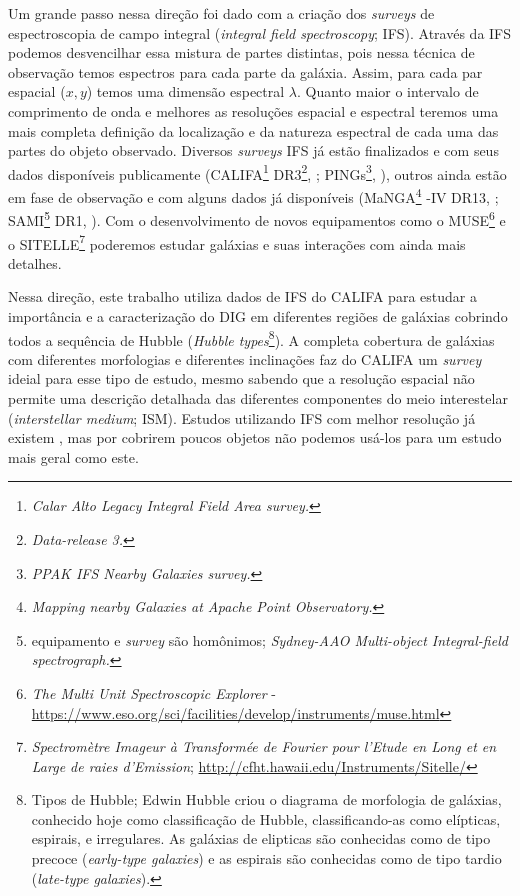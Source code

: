 Um grande passo nessa direção foi dado com a criação dos {\em surveys} de espectroscopia de campo integral ({\em integral field spectroscopy}; IFS). Através da IFS podemos desvencilhar essa mistura de partes distintas, pois nessa técnica de observação temos espectros para cada parte da galáxia. Assim, para cada par espacial ($x,y$) temos uma dimensão espectral $\lambda$. Quanto maior o intervalo de comprimento de onda e melhores as resoluções espacial e espectral teremos uma mais completa definição da localização e da natureza espectral de cada uma das partes do objeto observado. Diversos {\em surveys} IFS já estão finalizados e com seus dados disponíveis publicamente (CALIFA\footnote{\em Calar Alto Legacy Integral Field Area survey.} DR3\footnote{\em Data-release 3.}, \citealt{SFSanchez.DR3.2016}; PINGs\footnote{\em PPAK IFS Nearby Galaxies survey.}, \citealt{RosalesOrtega.etal.2010}), outros ainda estão em fase de observação e com alguns dados já disponíveis (MaNGA\footnote{\em Mapping nearby Galaxies at Apache Point Observatory.} \SDSS-IV DR13, \citealt{MaNGADR1.2017}; SAMI\footnote{equipamento e {\em survey} são homônimos; {\em Sydney-AAO Multi-object Integral-field spectrograph.}} DR1, \citealt{SAMIDR1.2017}). Com o desenvolvimento de novos equipamentos como o MUSE\footnote{{\em The Multi Unit Spectroscopic Explorer} - \href{https://www.eso.org/sci/facilities/develop/instruments/muse.html}{https://www.eso.org/sci/facilities/develop/instruments/muse.html}} e o SITELLE\footnote{{\em Spectromètre Imageur à Transformée de Fourier pour l'Etude en Long et en Large de raies d'Emission}; \href{http://cfht.hawaii.edu/Instruments/Sitelle/}{http://cfht.hawaii.edu/Instruments/Sitelle/}} poderemos estudar galáxias e suas interações com ainda mais detalhes.

Nessa direção, este trabalho utiliza dados de IFS do CALIFA para estudar a importância e a caracterização do DIG em diferentes regiões de galáxias cobrindo todos a sequência de Hubble ({\em Hubble types}\footnote{Tipos de Hubble; Edwin Hubble criou o diagrama de morfologia de galáxias, conhecido hoje como classificação de Hubble, classificando-as como elípticas, espirais, e irregulares. As galáxias de elipticas são conhecidas como de tipo precoce ({\em early-type galaxies}) e as espirais são conhecidas como de tipo tardio ({\em late-type galaxies}).}). A completa cobertura de galáxias com diferentes morfologias e diferentes inclinações faz do CALIFA um {\em survey} ideial para esse tipo de estudo, mesmo sabendo que a resolução espacial não permite uma descrição detalhada das diferentes componentes do meio interestelar ({\em interstellar medium}; ISM). Estudos utilizando IFS com melhor resolução já existem \citep{Sanchez.etal.2015MUSE, Vogt.etal.2017a, RousseauNepton.etal.2017}, mas por cobrirem poucos objetos não podemos usá-los para um estudo mais geral como este.



